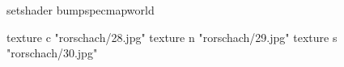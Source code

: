 setshader bumpspecmapworld

    texture c "rorschach/28.jpg"
    texture n "rorschach/29.jpg"
    texture s "rorschach/30.jpg"
